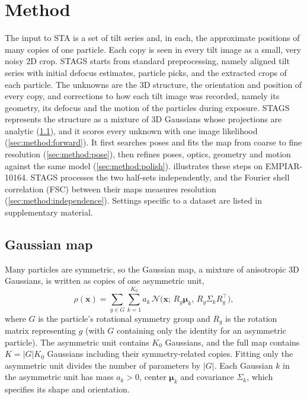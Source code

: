 \section{Method}
\label{sec:method}

The input to STA is a set of tilt series and, in each, the approximate positions of many copies of one particle.
Each copy is seen in every tilt image as a small, very noisy 2D crop.
STAGS starts from standard preprocessing, namely aligned tilt series with initial defocus estimates, particle picks, and the extracted crops of each particle.
The unknowns are the 3D structure, the orientation and position of every copy, and corrections to how each tilt image was recorded, namely its geometry, its defocus and the motion of the particles during exposure.
STAGS represents the structure as a mixture of 3D Gaussians whose projections are analytic (\cref{sec:method:repr}), and it scores every unknown with one image likelihood (\cref{sec:method:forward}).
It first searches poses and fits the map from coarse to fine resolution (\cref{sec:method:pose}), then refines poses, optics, geometry and motion against the same model (\cref{sec:method:polish}).
 illustrates these steps on EMPIAR-10164.
STAGS processes the two half-sets independently, and the Fourier shell correlation (FSC) between their maps measures resolution (\cref{sec:method:independence}).
Settings specific to a dataset are listed in supplementary material. %

\subsection{Gaussian map}
\label{sec:method:repr}

Many particles are symmetric, so the Gaussian map, a mixture of anisotropic 3D Gaussians, is written as copies of one asymmetric unit,
\begin{equation}
\rho(\mathbf{x})=\sum_{g\in G}\sum_{k=1}^{K_0}a_k\,\mathcal{N}\!\big(\mathbf{x};\,R_g\bm{\mu}_k,\,R_g\Sigma_kR_g^{\top}\big),
\label{eq:density}
\end{equation}
where $G$ is the particle's rotational symmetry group and $R_g$ is the rotation matrix representing $g$ (with $G$ containing only the identity for an asymmetric particle). The asymmetric unit contains $K_0$ Gaussians, and the full map contains $K=|G|K_0$ Gaussians including their symmetry-related copies.
Fitting only the asymmetric unit divides the number of parameters by $|G|$.
Each Gaussian $k$ in the asymmetric unit has mass $a_k>0$, center $\bm{\mu}_k$ and covariance $\Sigma_k$, which specifies its shape and orientation.

